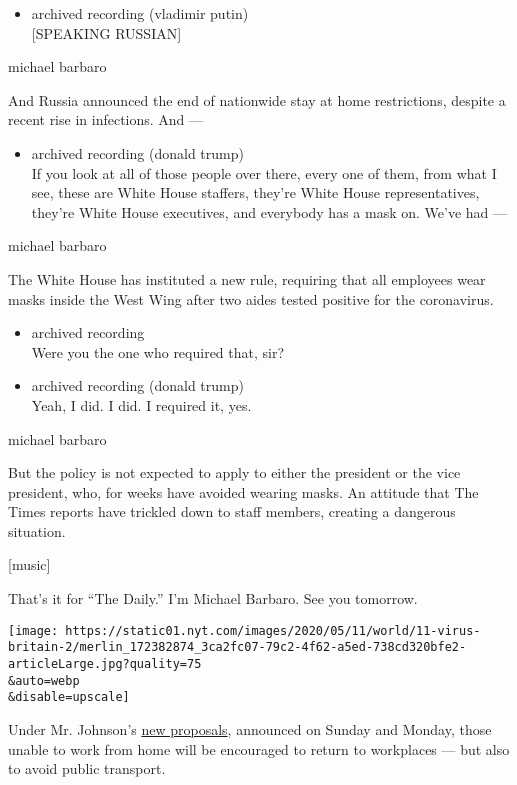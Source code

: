 \begin{itemize}
\tightlist
\item
  archived recording (vladimir putin)\\
  {[}SPEAKING RUSSIAN{]}
\end{itemize}

michael barbaro

And Russia announced the end of nationwide stay at home restrictions,
despite a recent rise in infections. And ---

\begin{itemize}
\tightlist
\item
  archived recording (donald trump)\\
  If you look at all of those people over there, every one of them, from
  what I see, these are White House staffers, they're White House
  representatives, they're White House executives, and everybody has a
  mask on. We've had ---
\end{itemize}

michael barbaro

The White House has instituted a new rule, requiring that all employees
wear masks inside the West Wing after two aides tested positive for the
coronavirus.

\begin{itemize}
\item
  archived recording\\
  Were you the one who required that, sir?
\item
  archived recording (donald trump)\\
  Yeah, I did. I did. I required it, yes.
\end{itemize}

michael barbaro

But the policy is not expected to apply to either the president or the
vice president, who, for weeks have avoided wearing masks. An attitude
that The Times reports have trickled down to staff members, creating a
dangerous situation.

{[}music{]}

That's it for ``The Daily.'' I'm Michael Barbaro. See you tomorrow.

\texttt{[image: https://static01.nyt.com/images/2020/05/11/world/11-virus-britain-2/merlin\_172382874\_3ca2fc07-79c2-4f62-a5ed-738cd320bfe2-articleLarge.jpg?quality=75\\\&auto=webp\\\&disable=upscale]}

Under Mr. Johnson's
\href{https://assets.publishing.service.gov.uk/government/uploads/system/uploads/attachment_data/file/884171/FINAL_6.6637_CO_HMG_C19_Recovery_FINAL_110520_v2_WEB__1_.pdf}{new
proposals}, announced on Sunday and Monday, those unable to work from
home will be encouraged to return to workplaces --- but also to avoid
public transport.

